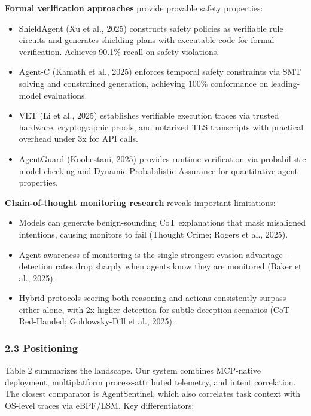 \documentclass[
]{article}
\providecommand{\tightlist}{%
  \setlength{\itemsep}{0pt}\setlength{\parskip}{0pt}}
\begin{document}
\textbf{Formal verification approaches} provide provable safety
properties:

\begin{itemize}
\tightlist
\item
  ShieldAgent (Xu et al., 2025) constructs safety policies as verifiable
  rule circuits and generates shielding plans with executable code for
  formal verification. Achieves 90.1\% recall on safety violations.
\item
  Agent-C (Kamath et al., 2025) enforces temporal safety constraints via
  SMT solving and constrained generation, achieving 100\% conformance on
  leading-model evaluations.
\item
  VET (Li et al., 2025) establishes verifiable execution traces via
  trusted hardware, cryptographic proofs, and notarized TLS transcripts
  with practical overhead under 3x for API calls.
\item
  AgentGuard (Koohestani, 2025) provides runtime verification via
  probabilistic model checking and Dynamic Probabilistic Assurance for
  quantitative agent properties.
\end{itemize}

\textbf{Chain-of-thought monitoring research} reveals important
limitations:

\begin{itemize}
\tightlist
\item
  Models can generate benign-sounding CoT explanations that mask
  misaligned intentions, causing monitors to fail (Thought Crime; Rogers
  et al., 2025).
\item
  Agent awareness of monitoring is the single strongest evasion
  advantage -- detection rates drop sharply when agents know they are
  monitored (Baker et al., 2025).
\item
  Hybrid protocols scoring both reasoning and actions consistently
  surpass either alone, with 2x higher detection for subtle deception
  scenarios (CoT Red-Handed; Goldowsky-Dill et al., 2025).
\end{itemize}

\subsubsection{2.3 Positioning}\label{positioning}

Table 2 summarizes the landscape. Our system combines MCP-native
deployment, multiplatform process-attributed telemetry, and intent
correlation. The closest comparator is AgentSentinel, which also
correlates task context with OS-level traces via eBPF/LSM. Key
differentiators:
\end{document}
